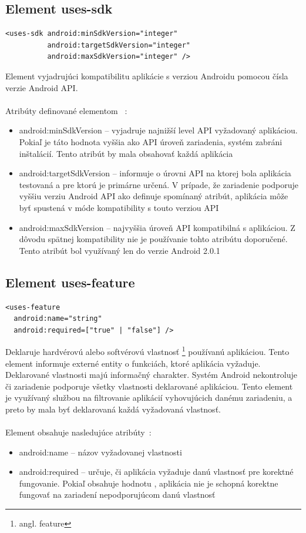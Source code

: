 \subsection{Element uses-sdk}
\lstset{language=XML}
\begin{lstlisting}
<uses-sdk android:minSdkVersion="integer"
          android:targetSdkVersion="integer"
          android:maxSdkVersion="integer" />
\end{lstlisting}
Element vyjadrujúci kompatibilitu aplikácie s verziou Androidu pomocou čísla verzie Android API.\\\\
Atribúty definované elementom ~\cite{elUsesSdk}:\\
\begin{itemize}
\item android:minSdkVersion – vyjadruje najnižší level API vyžadovaný aplikáciou. Pokiaľ je táto hodnota vyššia ako API úroveň zariadenia, systém zabráni inštalácií. Tento atribút by mala obsahovať každá aplikácia
\item android:targetSdkVersion – informuje o úrovni API na ktorej bola aplikácia testovaná a pre ktorú je primárne určená. V prípade, že zariadenie podporuje vyššiu verziu Android API ako definuje spomínaný atribút, aplikácia môže byť spustená v móde kompatibility s touto verziou API 
\item android:maxSdkVersion – najvyššia úroveň API kompatibilná s aplikáciou. Z dôvodu spätnej kompatibility nie je používanie tohto atribútu doporučené. Tento atribút bol využívaný len do verzie Android 2.0.1
\end{itemize}

\subsection{Element uses-feature}
\label{el_uses-feature}
\lstset{language=XML}
\begin{lstlisting}
<uses-feature
  android:name="string"
  android:required=["true" | "false"] />
\end{lstlisting}
Deklaruje hardvérovú alebo softvérovú vlastnosť \footnote{angl. feature} používanú aplikáciou. Tento element informuje externé entity o funkciách, ktoré aplikácia vyžaduje. Deklarované vlastnosti majú informačný charakter. Systém Android nekontroluje či zariadenie podporuje všetky vlastnosti deklarované aplikáciou. Tento element je využívaný službou  na  filtrovanie aplikácií vyhovujúcich danému zariadeniu, a preto by mala byť deklarovaná každá vyžadovaná vlastnosť.\\\\ Element obsahuje nasledujúce atribúty~\cite{elUsesFeature}:\\
\begin{itemize}
\item android:name – názov vyžadovanej vlastnosti
\item android:required – určuje, či aplikácia vyžaduje danú vlastnosť pre korektné fungovanie. Pokiaľ obsahuje hodnotu , aplikácia nie je schopná korektne fungovať na zariadení nepodporujúcom danú vlastnosť
\end{itemize}

